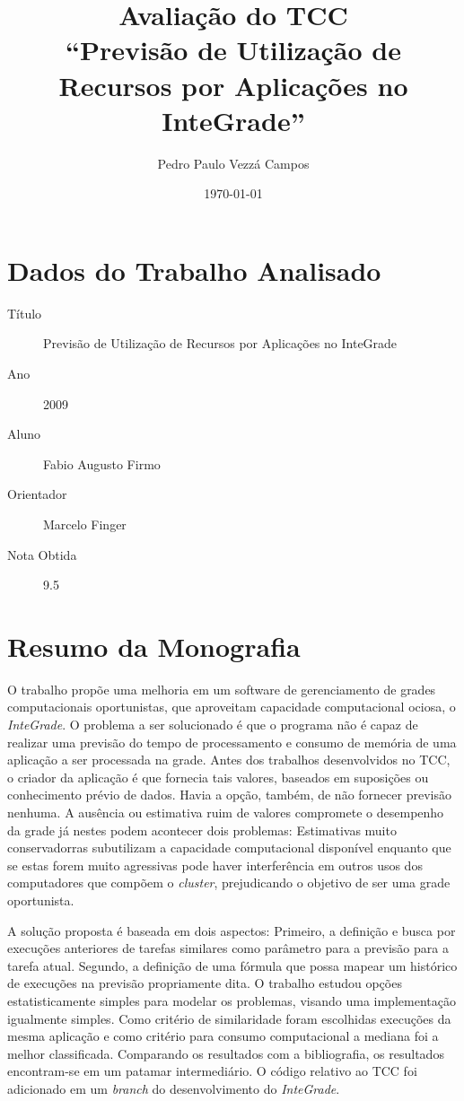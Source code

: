 \documentclass{article}
\begin{document}
\author{Pedro Paulo Vezzá Campos}
\title{Avaliação do TCC \\ ``Previsão de Utilização de Recursos por Aplicações no InteGrade''}
\date{\today}
\maketitle

\section{Dados do Trabalho Analisado}
	\begin{description}
		\item[Título] Previsão de Utilização de Recursos por Aplicações no InteGrade
		\item[Ano] 2009
		\item[Aluno] Fabio Augusto Firmo
		\item[Orientador] Marcelo Finger
		\item[Nota Obtida] 9.5
	\end{description}

\section{Resumo da Monografia}
	O trabalho propõe uma melhoria em um software de gerenciamento de grades computacionais oportunistas, que aproveitam capacidade computacional ociosa, o \emph{InteGrade}. O problema a ser solucionado é que o programa não é capaz de realizar uma previsão do tempo de processamento e consumo de memória de uma aplicação a ser processada na grade. Antes dos trabalhos desenvolvidos no TCC, o criador da aplicação é que fornecia tais valores, baseados em suposições ou conhecimento prévio de dados. Havia a opção, também, de não fornecer previsão nenhuma. A ausência ou estimativa ruim de valores compromete o desempenho da grade já nestes podem acontecer dois problemas: Estimativas muito conservadorras subutilizam a capacidade computacional disponível enquanto que se estas forem muito agressivas pode haver interferência em outros usos dos computadores que compõem o \emph{cluster}, prejudicando o objetivo de ser uma grade oportunista.

	A solução proposta é baseada em dois aspectos: Primeiro, a definição e busca por execuções anteriores de tarefas similares como parâmetro para a previsão para a tarefa atual. Segundo, a definição de uma fórmula que possa mapear um histórico de execuções na previsão propriamente dita. O trabalho estudou opções estatisticamente simples para modelar os problemas, visando uma implementação igualmente simples. Como critério de similaridade foram escolhidas execuções da mesma aplicação e como critério para consumo computacional a mediana foi a melhor classificada. Comparando os resultados com a bibliografia, os resultados encontram-se em um patamar intermediário. O código relativo ao TCC foi adicionado em um \emph{branch} do desenvolvimento do \emph{InteGrade}.
	
\end{document}
